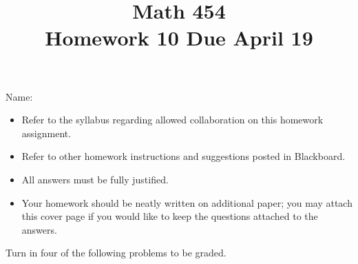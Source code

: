 \documentclass[11pt]{amsart}%
\begin{document}
\title{Math 454\\ Homework 10 %
\qquad Due April 19%
}
\author{}
\date{}
\maketitle
\thispagestyle{empty}

\noindent Name:~\hrulefill~~\\

\begin{itemize}
\item Refer to the syllabus regarding allowed collaboration on this homework assignment.
\item Refer to other homework instructions and suggestions posted in Blackboard.
\item All answers must be fully justified.
\item Your homework should be neatly written on additional paper; you may attach this cover page if you would like to keep the questions attached to the answers.
\end{itemize}

\bigskip
Turn in four of the following problems to be graded.
\bigskip
\end{document}
